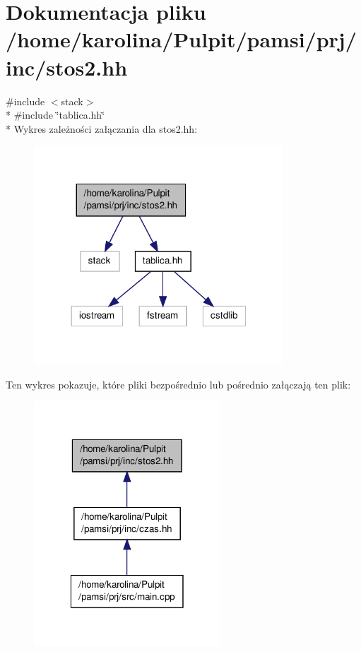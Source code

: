 \hypertarget{stos2_8hh}{\section{Dokumentacja pliku /home/karolina/\-Pulpit/pamsi/prj/inc/stos2.hh}
\label{stos2_8hh}
}
{\ttfamily \#include $<$stack$>$}\\*
{\ttfamily \#include \char`\"{}tablica.\-hh\char`\"{}}\\*
Wykres zależności załączania dla stos2.\-hh\-:\nopagebreak
\begin{figure}[H]
\begin{center}
\leavevmode
\includegraphics[width=264pt]{stos2_8hh__incl}
\end{center}
\end{figure}
Ten wykres pokazuje, które pliki bezpośrednio lub pośrednio załączają ten plik\-:\nopagebreak
\begin{figure}[H]
\begin{center}
\leavevmode
\includegraphics[width=198pt]{stos2_8hh__dep__incl}
\end{center}
\end{figure}

